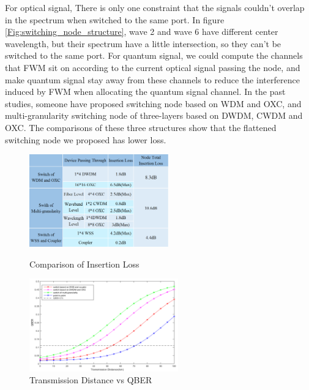 \documentclass[letterpaper,10pt]{article}
\begin{document}
For optical signal, There is only one constraint that the signals couldn't overlap in the spectrum when switched to the same port. In figure \ref{Fig:switching_node_structure}, wave 2 and wave 6 have different center wavelength, but their spectrum have a little intersection, so they can't be switched to the same port. For quantum signal, we could compute the channels that FWM sit on according to the current optical signal passing the node, and make quantum signal stay away from these channels to reduce the interference induced by FWM when allocating the quantum signal channel. In the past studies, someone have proposed switching node based on WDM and OXC, and multi-granularity switching node of three-layers based on DWDM, CWDM and OXC. The comparisons of these three structures show that the flattened switching node we proposed has lower loss.

\begin{figure}[!htb]
   \begin{minipage}{0.48\textwidth}
     \centering
     \includegraphics[height= 4cm,width=.9\linewidth]{comparison_of_three_kind_of_nodes_prety}
     \caption{Comparison of Insertion Loss} 
     \label{Fig:loss_of_insertion}
   \end{minipage}\hfill
   \begin{minipage}{0.48\textwidth}
     \centering
     \includegraphics[height= 4cm,width=.9\linewidth]{transmission_distance_vs_QBER_of_three_nodes_3}
     \caption{Transmission Distance vs QBER} 
     \label{Fig:distance_vs_qber}
   \end{minipage}
\end{figure}
\end{document}
